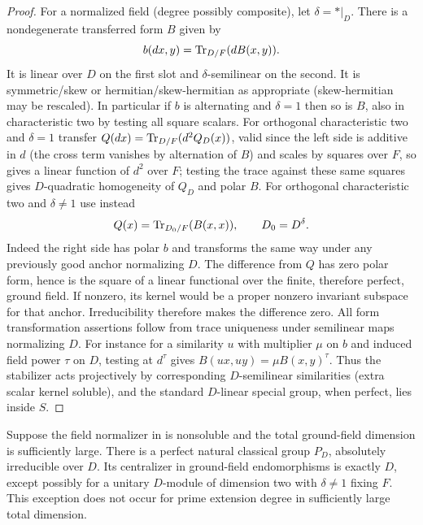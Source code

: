 \begin{proof}
For a normalized field (degree possibly composite), let \(\delta=*|_D\). There is a nondegenerate transferred form \(B\) given by
\[
 b(dx,y)={\rm Tr}_{D/F}(d B(x,y)).
\]
It is linear over \(D\) on the first slot and \(\delta\)-semilinear on the second. It is symmetric/skew or hermitian/skew-hermitian as appropriate (skew-hermitian may be rescaled). In particular if \(b\) is alternating and \(\delta=1\) then so is \(B\), also in characteristic two by testing all square scalars. For orthogonal characteristic two and \(\delta=1\) transfer \(Q(dx)={\rm Tr}_{D/F}(d^2 Q_D(x))\), valid since the left side is additive in \(d\) (the cross term vanishes by alternation of \(B\)) and scales by squares over \(F\), so gives a linear function of \(d^2\) over \(F\); testing the trace against these same squares gives \(D\)-quadratic homogeneity of \(Q_D\) and polar \(B\). For orthogonal characteristic two and \(\delta\ne1\) use instead
\[
 Q(x)={\rm Tr}_{D_0/F}(B(x,x)),\qquad D_0=D^\delta .
\]
Indeed the right side has polar \(b\) and transforms the same way under any previously good anchor normalizing \(D\). The difference from \(Q\) has zero polar form, hence is the square of a linear functional over the finite, therefore perfect, ground field. If nonzero, its kernel would be a proper nonzero invariant subspace for that anchor. Irreducibility therefore makes the difference zero. All form transformation assertions follow from trace uniqueness under semilinear maps normalizing \(D\). For instance for a similarity \(u\) with multiplier \(\mu\) on \(b\) and induced field power \(\tau\) on \(D\), testing at \(d^\tau\) gives \(B(ux,uy)=\mu B(x,y)^\tau\). Thus the stabilizer acts projectively by corresponding \(D\)-semilinear similarities (extra scalar kernel soluble), and the standard \(D\)-linear special group, when perfect, lies inside \(S\).
\end{proof}

\begin{lemma}\label{c:transfer-centralizer}
Suppose the field normalizer in  is nonsoluble and the total ground-field dimension is sufficiently large. There is a perfect natural classical group \(P_D\), absolutely irreducible over \(D\). Its centralizer in ground-field endomorphisms is exactly \(D\), except possibly for a unitary \(D\)-module of dimension two with \(\delta\ne1\) fixing \(F\). This exception does not occur for prime extension degree in sufficiently large total dimension.
\end{lemma}

